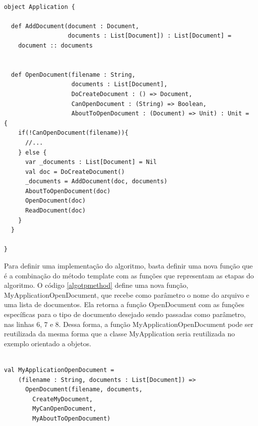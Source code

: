 \begin{lstlisting}[caption={Template Method Funcional},label=fptpmethod]
    
object Application {

  def AddDocument(document : Document,
                  documents : List[Document]) : List[Document] =
    document :: documents


  def OpenDocument(filename : String,
                   documents : List[Document],
                   DoCreateDocument : () => Document,
                   CanOpenDocument : (String) => Boolean,
                   AboutToOpenDocument : (Document) => Unit) : Unit = {
    if(!CanOpenDocument(filename)){
      //...
    } else {
      var _documents : List[Document] = Nil
      val doc = DoCreateDocument()
      _documents = AddDocument(doc, documents)
      AboutToOpenDocument(doc)
      OpenDocument(doc)
      ReadDocument(doc)
    }
  }

}

\end{lstlisting}

Para definir uma implementação do algoritmo, basta 
definir uma nova função que é a combinação do método 
template com as funções que representam as etapas do 
algoritmo. O código \ref{algotpmethod} define uma 
nova função, MyApplicationOpenDocument, que recebe 
como parâmetro o nome do arquivo e uma lista de 
documentos. Ela retorna a função OpenDocument com as 
funções específicas para o tipo de documento 
desejado sendo passadas como parâmetro, nas linhas 
6, 7 e 8. Dessa forma, a função MyApplicationOpenDocument 
pode ser reutilizada da mesma forma que a classe 
MyApplication seria reutilizada no exemplo orientado 
a objetos.

\begin{lstlisting}[caption={Definição do algoritmo},label=algotpmethod]
    
val MyApplicationOpenDocument = 
    (filename : String, documents : List[Document]) => 
      OpenDocument(filename, documents,
        CreateMyDocument,
        MyCanOpenDocument,
        MyAboutToOpenDocument)

\end{lstlisting}

